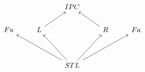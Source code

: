 \[\begin{tikzcd}
	&& IPC \\
	Fu & L && R & Fa \\
	\\
	&& STL
	\arrow[from=4-3, to=2-1]
	\arrow[from=2-4, to=1-3]
	\arrow[from=2-2, to=1-3]
	\arrow[from=4-3, to=2-2]
	\arrow[from=4-3, to=2-4]
	\arrow[from=4-3, to=2-5]
\end{tikzcd}\]